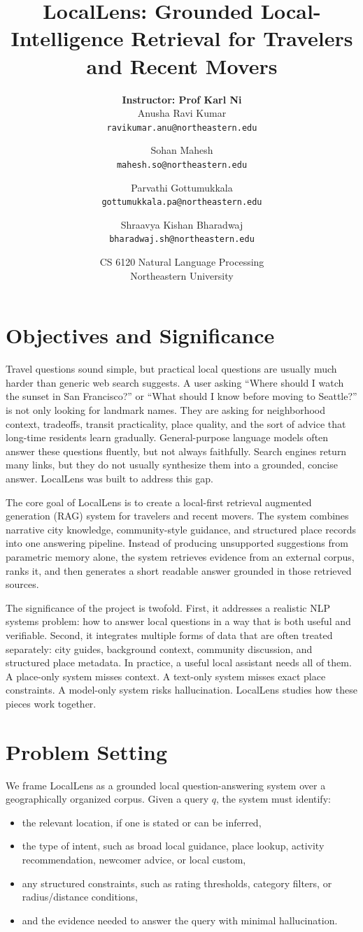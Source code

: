 \documentclass[11pt]{article}
\title{\textbf{LocalLens: Grounded Local-Intelligence Retrieval for Travelers and Recent Movers}}
\author{
\textbf{Instructor: Prof Karl Ni} \\[1em]
Anusha Ravi Kumar \\
\texttt{ravikumar.anu@northeastern.edu}
\and
Sohan Mahesh \\
\texttt{mahesh.so@northeastern.edu}
\and
Parvathi Gottumukkala \\
\texttt{gottumukkala.pa@northeastern.edu}
\and
Shraavya Kishan Bharadwaj \\
\texttt{bharadwaj.sh@northeastern.edu}
}
\date{CS 6120 \quad Natural Language Processing \\ Northeastern University}
\begin{document}
\maketitle

\section{Objectives and Significance}
Travel questions sound simple, but practical local questions are usually much harder than generic web search suggests. A user asking ``Where should I watch the sunset in San Francisco?'' or ``What should I know before moving to Seattle?'' is not only looking for landmark names. They are asking for neighborhood context, tradeoffs, transit practicality, place quality, and the sort of advice that long-time residents learn gradually. General-purpose language models often answer these questions fluently, but not always faithfully. Search engines return many links, but they do not usually synthesize them into a grounded, concise answer. LocalLens was built to address this gap.

The core goal of LocalLens is to create a local-first retrieval augmented generation (RAG) system for travelers and recent movers. The system combines narrative city knowledge, community-style guidance, and structured place records into one answering pipeline. Instead of producing unsupported suggestions from parametric memory alone, the system retrieves evidence from an external corpus, ranks it, and then generates a short readable answer grounded in those retrieved sources.

The significance of the project is twofold. First, it addresses a realistic NLP systems problem: how to answer local questions in a way that is both useful and verifiable. Second, it integrates multiple forms of data that are often treated separately: city guides, background context, community discussion, and structured place metadata. In practice, a useful local assistant needs all of them. A place-only system misses context. A text-only system misses exact place constraints. A model-only system risks hallucination. LocalLens studies how these pieces work together.

\section{Problem Setting}
We frame LocalLens as a grounded local question-answering system over a geographically organized corpus. Given a query $q$, the system must identify:
\begin{itemize}[leftmargin=*]
    \item the relevant location, if one is stated or can be inferred,
    \item the type of intent, such as broad local guidance, place lookup, activity recommendation, newcomer advice, or local custom,
    \item any structured constraints, such as rating thresholds, category filters, or radius/distance conditions,
    \item and the evidence needed to answer the query with minimal hallucination.
\end{itemize}
\end{document}
